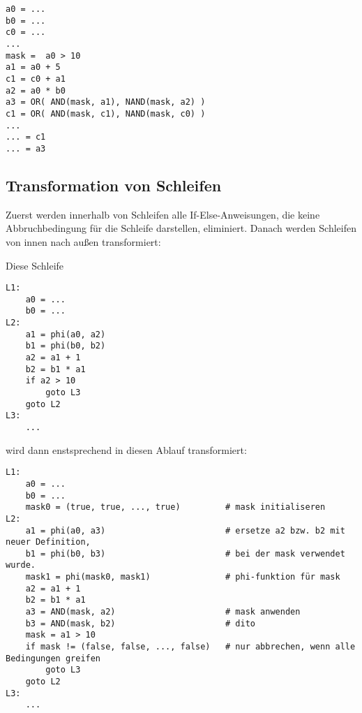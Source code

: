 \documentclass[a4paper,10pt]{article}
\begin{document}
\begin{verbatim}
a0 = ...
b0 = ...
c0 = ...
...
mask =  a0 > 10 
a1 = a0 + 5
c1 = c0 + a1
a2 = a0 * b0
a3 = OR( AND(mask, a1), NAND(mask, a2) )
c1 = OR( AND(mask, c1), NAND(mask, c0) )
...
... = c1
... = a3
\end{verbatim}

\subsection{Transformation von Schleifen}

Zuerst werden innerhalb von Schleifen alle If-Else-Anweisungen, die keine Abbruchbedingung für die
Schleife darstellen, eliminiert. Danach werden Schleifen von innen nach außen transformiert:






Diese Schleife

\begin{verbatim}
L1:
    a0 = ...
    b0 = ...
L2:
    a1 = phi(a0, a2)
    b1 = phi(b0, b2)
    a2 = a1 + 1
    b2 = b1 * a1
    if a2 > 10
        goto L3
    goto L2
L3: 
    ...
\end{verbatim}

wird dann enstsprechend in diesen Ablauf transformiert:

\begin{verbatim}
L1:
    a0 = ...
    b0 = ...
    mask0 = (true, true, ..., true)         # mask initialiseren
L2:
    a1 = phi(a0, a3)                        # ersetze a2 bzw. b2 mit neuer Definition, 
    b1 = phi(b0, b3)                        # bei der mask verwendet wurde.
    mask1 = phi(mask0, mask1)               # phi-funktion für mask
    a2 = a1 + 1
    b2 = b1 * a1
    a3 = AND(mask, a2)                      # mask anwenden
    b3 = AND(mask, b2)                      # dito
    mask = a1 > 10
    if mask != (false, false, ..., false)   # nur abbrechen, wenn alle Bedingungen greifen
        goto L3
    goto L2
L3: 
    ...
\end{verbatim}
\end{document}
